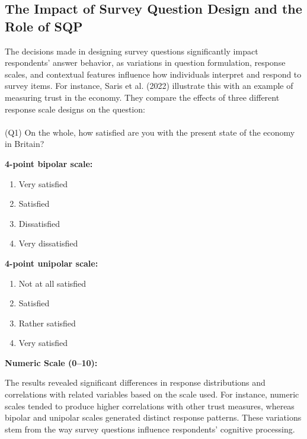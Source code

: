 \documentclass[
  letterpaper,
  DIV=11,
  numbers=noendperiod]{scrartcl}
\makeatletter
\let\oldparagraph\paragraph
\renewcommand{\paragraph}{
    \@ifstar
      \xxxParagraphStar
      \xxxParagraphNoStar
  }
\newcommand{\xxxParagraphStar}[1]{\oldparagraph*{#1}\mbox{}}
\newcommand{\xxxParagraphNoStar}[1]{\oldparagraph{#1}\mbox{}}
\providecommand{\tightlist}{%
  \setlength{\itemsep}{0pt}\setlength{\parskip}{0pt}}\usepackage{longtable,booktabs,array}
\makeatother
\begin{document}
\subsection{The Impact of Survey Question Design and the Role of
SQP}\label{the-impact-of-survey-question-design-and-the-role-of-sqp}

The decisions made in designing survey questions significantly impact
respondents' answer behavior, as variations in question formulation,
response scales, and contextual features influence how individuals
interpret and respond to survey items. For instance, Saris et al. (2022)
illustrate this with an example of measuring trust in the economy. They
compare the effects of three different response scale designs on the
question:

\paragraph{(Q1) On the whole, how satisfied are you with the present
state of the economy in
Britain?}\label{q1-on-the-whole-how-satisfied-are-you-with-the-present-state-of-the-economy-in-britain}

\textbf{4-point bipolar scale:}

\begin{enumerate}
\def\labelenumi{\arabic{enumi}.}
\tightlist
\item
  Very satisfied\\
\item
  Satisfied\\
\item
  Dissatisfied\\
\item
  Very dissatisfied
\end{enumerate}

\textbf{4-point unipolar scale:}

\begin{enumerate}
\def\labelenumi{\arabic{enumi}.}
\tightlist
\item
  Not at all satisfied\\
\item
  Satisfied\\
\item
  Rather satisfied\\
\item
  Very satisfied
\end{enumerate}

\textbf{Numeric Scale (0--10):}

The results revealed significant differences in response distributions
and correlations with related variables based on the scale used. For
instance, numeric scales tended to produce higher correlations with
other trust measures, whereas bipolar and unipolar scales generated
distinct response patterns. These variations stem from the way survey
questions influence respondents' cognitive processing.
\end{document}
